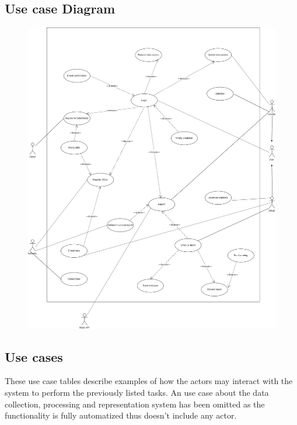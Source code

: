 \documentclass[12pt,a4paper]{article}
\begin{document}
\subsection{Use case Diagram}
	\begin{figure}[H]
			\centering
			\includegraphics[width=1.2\textwidth,height=.9\textheight]{Images/UseCaseDiagram.png}
	\end{figure}
\subsection{Use cases}
These use case tables describe examples of how the actors may interact with the system to perform the previously listed tasks. An use case about the data collection, processing and representation system has been omitted as the functionality is fully automatized
thus doesn't include any actor.
\end{document}
